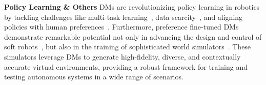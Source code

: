 \noindent\textbf{Policy Learning \& Others} DMs are revolutionizing policy learning in robotics by tackling challenges like multi-task learning~\citep{wang2024sparse}, data scarcity~\citep{liu2024rdt}, and aligning policies with human preferences~\citep{dong2023aligndiff}. Furthermore, preference fine-tuned DMs demonstrate remarkable potential not only in advancing the design and control of soft robots~\citep{wang2023diffusebot}, but also in the training of sophisticated world simulators~\citep{yang2023learning}. These simulators leverage DMs to generate high-fidelity, diverse, and contextually accurate virtual environments, providing a robust framework for training and testing autonomous systems in a wide range of scenarios.

